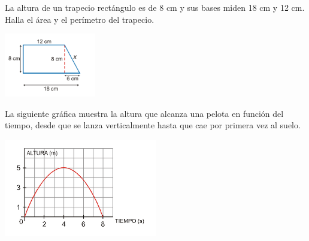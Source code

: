 \documentclass[addpoints,spanish, 12pt,a4paper]{exam}
\begin{document}
\begin{questions}
\question[1] La altura de un trapecio rectángulo es de 8 cm y sus bases miden 18 cm y 12 cm. Halla el área y el perímetro del trapecio.

\begin{center}
\includegraphics[width=0.3\textwidth]{trapecio}
\end{center}
    
\addpoints

\question[2] La siguiente gráfica muestra la altura que alcanza una pelota en función del tiempo, desde que se lanza verticalmente hasta que cae por primera vez al suelo.

\begin{center}
\includegraphics[width=0.5\textwidth]{grafica}
\end{center}
\noaddpoints %
    

\end{questions}
\end{document}
